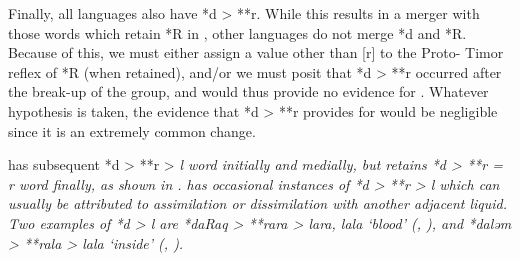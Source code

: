 Finally, all  languages also have *d > **r.
While this results in a merger with those words which retain
*R in , other languages do not merge *d and *R.
Because of this, we must either assign a value other than [r]
to the Proto- Timor reflex of *R (when retained),
and/or we must posit that *d > **r occurred after the break-up
of the group, and would thus provide no evidence for .
Whatever hypothesis is taken,
the evidence that *d > **r provides for  would
be negligible since it is an extremely common change.

 has subsequent *d > **r > \it{l} word initially
and medially, but retains *d > **r = \it{r} word finally,
as shown in .
 has occasional instances of *d > **r > \it{l} which
can usually be attributed to assimilation or dissimilation with another adjacent liquid.
Two examples of  *d > \it{l} are *daRaq > **rara
> \it{lara, lala} ‘blood’ (, ),
and *daləm > **rala > \it{lala} ‘inside’ (, ).

